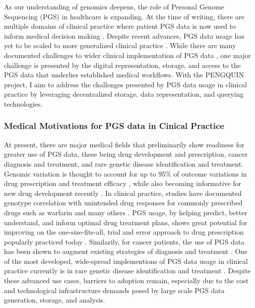 \documentclass[runningheads]{llncs}
\begin{document}
As our understanding of genomics deepens, the role of Personal Genome Sequencing (PGS) in healthcare is expanding. 
At the time of writing, there are multiple domains of clinical practice where patient PGS data is now used to inform medical decision making \cite{souche_recommendations_2022}\cite{gil_analysis_2015}. 
Despite recent advances, PGS data usage has yet to be scaled to more generalized clinical practice \cite{alzubi_personal_2014}. 
While there are many documented challenges to wider clinical implementation of PGS data \cite{stefanicka-wojtas_barriers_2023}, one major challenge is presented by the digital representation, storage, and access to the PGS data that underlies established medical workflows.
With the PENGQUIN project, I aim to address the challenges presented by PGS data usage in clinical practice by leveraging  decentralized storage, data representation, and querying technologies.  

\subsubsection{Medical Motivations for PGS data in Cinical Practice}
At present, there are major medical fields that preliminarily show readiness for greater use of PGS data, these being drug development and prescription, cancer diagnosis and treatment, and rare genetic disease identification and treatment.
Genomic variation is thought to account for up to 95\% of outcome variations in drug prescription and treatment efficacy \cite{belle_genetic_2008}, while also becoming informative for new drug development recently \cite{ko_new_2022}. 
In clinical practice, studies have documented genotype correlation with unintended drug responses for commonly prescribed drugs such as warfarin \cite{linder_genetic_2001} and many others \cite{research_table_2024}. 
PGS usage, by helping predict, better understand, and inform optimal drug treatment plans, shows great potential for improving on the one-size-fits-all, trial and error approach to drug prescription popularly practiced today \cite{hens_return_2011}. 
Similarily, for cancer patients, the use of PGS data has been shown to augment existing strategies of diagnosis and treatment \cite{mcleod_cancer_2013}. 
One of the most developed, wide-spread implementions of PGS data usage in clinical practice currently is in rare genetic disease identification and treatment \cite{krier_genomic_2016}. 
Despite these advanced use cases, barriers to adoption remain, especially due to the cost and technological infrastructure demands posed by large scale PGS data generation, storage, and analysis.
\end{document}
